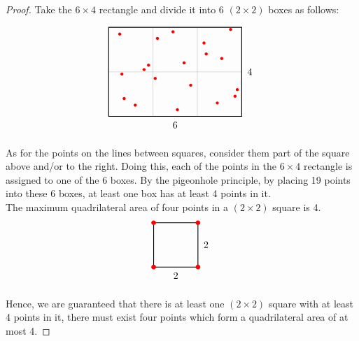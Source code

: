 \documentclass{article}
\begin{document}
\begin{proof}
    Take the $6 \times 4$ rectangle and divide it into 6 $(2 \times 2)$ boxes as follows:

    \[
    \begin{tikzpicture}[scale=0.8] 
    \draw[step=2cm,gray,very thin] (0,0) grid (6,4);

    \draw (3,-0.1) node[below] {6}; %
    \draw (6.1,2) node[right] {4};  %
    
    \draw[thick] (0,0) rectangle (6,4);
    
    \foreach \x/\y in {0.5/3.7, 1.8/2.3, 2.9/3.8, 3.7/1.4, 5.1/2.6, 1.2/0.5, 
                       4.3/3.3, 5.5/3.9, 0.7/0.8, 2.1/1.7, 3.4/2.4, 4.9/0.6,
                       0.6/1.9, 5.8/1.2, 3.1/0.3, 2.2/3.5, 1.6/2.1, 4.4/2.8, 5.7/0.9} {
        \fill[red] (\x,\y) circle (2pt);
    }
    \end{tikzpicture}
\]

As for the points on the lines between squares, consider them part of the square above and/or to the right. Doing this, each of the points in the $6 \times 4$ rectangle is assigned to one of the 6 boxes. By the pigeonhole principle, by placing 19 points into these 6 boxes, at least one box has at least 4 points in it.\\
The maximum quadrilateral area of four points in a $(2 \times 2)$ square is 4.
\[
    \begin{tikzpicture}[scale=0.8] 
    \draw[thick] (0,0) rectangle (2,2);
    
    \draw (1,-0.1) node[below] {2}; %
    \draw (2.1,1) node[right] {2};  %
    
    \fill[red] (0,0) circle (3pt);  %
    \fill[red] (2,0) circle (3pt);  %
    \fill[red] (0,2) circle (3pt);  %
    \fill[red] (2,2) circle (3pt);  %
    \end{tikzpicture}
\]

Hence, we are guaranteed that there is at least one $(2 \times 2)$ square with at least 4 points in it, there must exist four points which form a quadrilateral area of at most 4.

\end{proof}

\newpage
\end{document}
